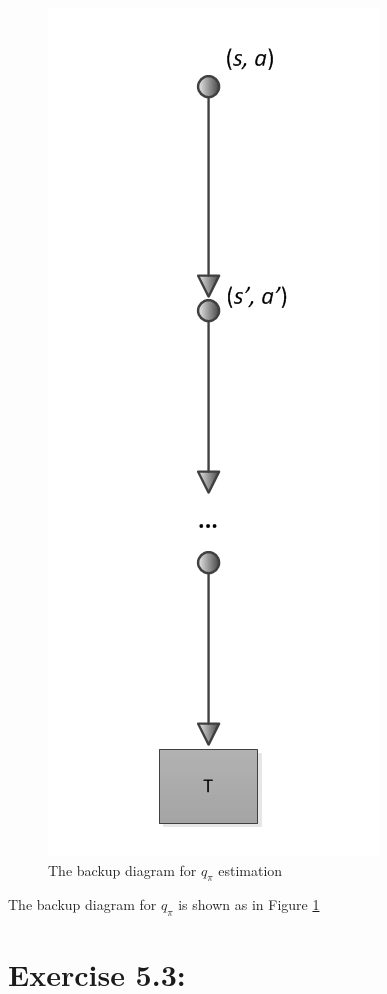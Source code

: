 \documentclass[10pt,letterpaper]{article}
\begin{document}
\begin{figure}[htp]
\begin{center}
  \includegraphics[scale=0.2]{backup_mc_q}

\end{center}
  \caption{The backup diagram for $q_\pi$ estimation}
  \label{fig:backup_mc_q}
\end{figure}

The backup diagram for $q_\pi$ is shown as in Figure \ref{fig:backup_mc_q}

\section*{Exercise 5.3: }
\label{5.3}
\end{document}
